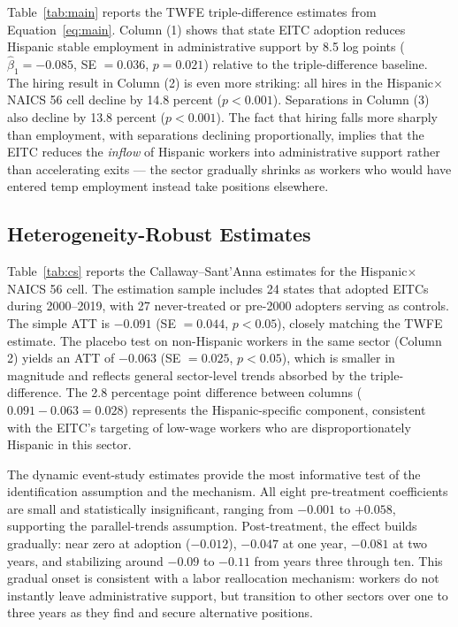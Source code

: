 \documentclass[12pt]{article}
\begin{document}
Table~\ref{tab:main} reports the TWFE triple-difference estimates from Equation~\eqref{eq:main}. Column (1) shows that state EITC adoption reduces Hispanic stable employment in administrative support by 8.5 log points ($\hat{\beta}_1 = -0.085$, SE $= 0.036$, $p = 0.021$) relative to the triple-difference baseline. The hiring result in Column (2) is even more striking: all hires in the Hispanic$\times$NAICS 56 cell decline by 14.8 percent ($p < 0.001$). Separations in Column (3) also decline by 13.8 percent ($p < 0.001$). The fact that hiring falls more sharply than employment, with separations declining proportionally, implies that the EITC reduces the \textit{inflow} of Hispanic workers into administrative support rather than accelerating exits --- the sector gradually shrinks as workers who would have entered temp employment instead take positions elsewhere.



\subsection{Heterogeneity-Robust Estimates}

Table~\ref{tab:cs} reports the Callaway--Sant'Anna estimates for the Hispanic$\times$NAICS 56 cell. The estimation sample includes 24 states that adopted EITCs during 2000--2019, with 27 never-treated or pre-2000 adopters serving as controls. The simple ATT is $-0.091$ (SE $= 0.044$, $p < 0.05$), closely matching the TWFE estimate. The placebo test on non-Hispanic workers in the same sector (Column 2) yields an ATT of $-0.063$ (SE $= 0.025$, $p < 0.05$), which is smaller in magnitude and reflects general sector-level trends absorbed by the triple-difference. The 2.8 percentage point difference between columns ($0.091 - 0.063 = 0.028$) represents the Hispanic-specific component, consistent with the EITC's targeting of low-wage workers who are disproportionately Hispanic in this sector.



The dynamic event-study estimates provide the most informative test of the identification assumption and the mechanism. All eight pre-treatment coefficients are small and statistically insignificant, ranging from $-0.001$ to $+0.058$, supporting the parallel-trends assumption. Post-treatment, the effect builds gradually: near zero at adoption ($-0.012$), $-0.047$ at one year, $-0.081$ at two years, and stabilizing around $-0.09$ to $-0.11$ from years three through ten. This gradual onset is consistent with a labor reallocation mechanism: workers do not instantly leave administrative support, but transition to other sectors over one to three years as they find and secure alternative positions.
\end{document}
